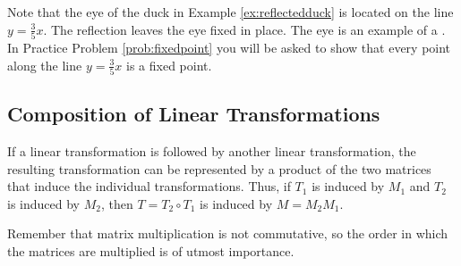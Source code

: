 \documentclass{ximera}
\begin{document}
Note that the eye of the duck in Example \ref{ex:reflectedduck} is located on the line $y=\frac{3}{5}x$.  The reflection leaves the eye fixed in place.  The eye is an example of a .  In Practice Problem \ref{prob:fixedpoint} you will be asked to show that every point along the line $y=\frac{3}{5}x$ is a fixed point.

\subsection*{Composition of Linear Transformations}

If a linear transformation is followed by another linear transformation, the resulting transformation can be represented by a product of the two matrices that induce the individual transformations.  Thus, if $T_1$ is induced by $M_1$ and $T_2$ is induced by $M_2$, then $T=T_2\circ T_1$ is induced by $M=M_2M_1$.

\begin{center}
\end{center}

Remember that matrix multiplication is not commutative, so the order in which the matrices are multiplied is of utmost importance.
\end{document}
